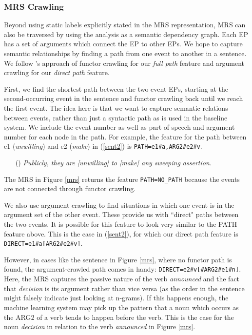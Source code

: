 \documentclass[11pt]{article}
\begin{document}
\subsubsection{MRS Crawling}

Beyond using static labels explicitly stated in the MRS representation, MRS can also be traversed by using the analysis as a semantic dependency graph. Each EP has a set of arguments which connect the EP to other EPs. We hope to capture semantic relationships by finding a path from one event to another in a sentence. We follow 's approach of functor crawling for our \emph{full path} feature and argument crawling for our \emph{direct path} feature.

First, we find the shortest path between the two event EPs, starting at the second-occurring event in the sentence and functor crawling back until we reach the first event. The idea here is that we want to capture semantic relations between events, rather than just a syntactic path as is used in the baseline system. We include the event number as well as part of speech and argument number for each node in the path. For example, the feature for the path between e1 (\emph{unwilling}) and e2 (\emph{make}) in (\ref{sent2}) is \texttt{PATH=e1\#a,ARG2\#e2\#v}.
\begin{itemize}[labelindent=2em, labelsep*=2em, leftmargin=!]
\item[(\exampleno)]\label{sent2} \emph{Publicly, they are [unwilling] to [make] any sweeping assertion.}
\end{itemize}
The MRS in Figure \ref{mrs} returns the feature \texttt{PATH=NO\_PATH} because the events are not connected through functor crawling.

We also use argument crawling to find situations in which one event is in the argument set of the other event. These provide us with ``direct" paths between the two events. It is possible for this feature to look very similar to the PATH feature above. This is the case in (\ref{sent2}), for which our direct path feature is \texttt{DIRECT=e1\#a[ARG2\#e2\#v]}.

However, in cases like the sentence in Figure \ref{mrs}, where no functor path is found, the argument-crawled path comes in handy: \texttt{DIRECT=e2\#v[\#ARG2\#e1\#n]}. Here, the MRS captures the passive nature of the verb \emph{announced} and the fact that \emph{decision} is its argument rather than vice versa (as the order in the sentence might falsely indicate just looking at n-grams). If this happens enough, the machine learning system may pick up the pattern that a noun which occurs as the ARG2 of a verb tends to happen before the verb. This is the case for the noun \emph{decision} in relation to the verb \emph{announced} in Figure \ref{mrs}.
\end{document}
